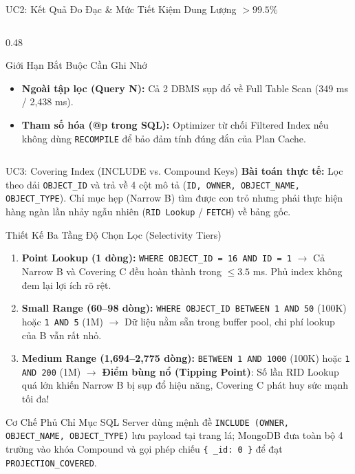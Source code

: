 \documentclass[aspectratio=169,9pt]{beamer}
\begin{document}
\begin{frame}{UC2: Kết Quả Đo Đạc \& Mức Tiết Kiệm Dung Lượng $>99.5\%$}
\begin{columns}[T]
\begin{column}{0.48\textwidth}
\begin{alertblock}{Giới Hạn Bắt Buộc Cần Ghi Nhớ}
\scriptsize
\begin{itemize}
  \item \textbf{Ngoài tập lọc (Query N):} Cả 2 DBMS sụp đổ về Full Table Scan (349 ms / 2,438 ms).
  \item \textbf{Tham số hóa (@p trong SQL):} Optimizer từ chối Filtered Index nếu không dùng \texttt{RECOMPILE} để bảo đảm tính đúng đắn của Plan Cache.
\end{itemize}
\end{alertblock}
\end{column}
\end{columns}
\end{frame}

\begin{frame}{UC3: Covering Index (INCLUDE vs. Compound Keys)}
\textbf{Bài toán thực tế:} Lọc theo dải \texttt{OBJECT\_ID} và trả về 4 cột mô tả (\texttt{ID, OWNER, OBJECT\_NAME, OBJECT\_TYPE}). Chỉ mục hẹp (Narrow B) tìm được con trỏ nhưng phải thực hiện hàng ngàn lần nhảy ngẫu nhiên (\texttt{RID Lookup} / \texttt{FETCH}) về bảng gốc.

\begin{block}{Thiết Kế Ba Tầng Độ Chọn Lọc (Selectivity Tiers)}
\footnotesize
\begin{enumerate}
  \item \textbf{Point Lookup (1 dòng):} \texttt{WHERE OBJECT\_ID = 16 AND ID = 1} $\to$ Cả Narrow B và Covering C đều hoàn thành trong $\le 3.5$ ms. Phủ index không đem lại lợi ích rõ rệt.
  \item \textbf{Small Range (60--98 dòng):} \texttt{WHERE OBJECT\_ID BETWEEN 1 AND 50} (100K) hoặc \texttt{1 AND 5} (1M) $\to$ Dữ liệu nằm sẵn trong buffer pool, chi phí lookup của B vẫn rất nhỏ.
  \item \textbf{Medium Range (1,694--2,775 dòng):} \texttt{BETWEEN 1 AND 1000} (100K) hoặc \texttt{1 AND 200} (1M) $\to$ \textbf{Điểm bùng nổ (Tipping Point)}: Số lần RID Lookup quá lớn khiến Narrow B bị sụp đổ hiệu năng, Covering C phát huy sức mạnh tối đa!
\end{enumerate}
\end{block}

\begin{exampleblock}{Cơ Chế Phủ Chỉ Mục}
\footnotesize
SQL Server dùng mệnh đề \texttt{INCLUDE (OWNER, OBJECT\_NAME, OBJECT\_TYPE)} lưu payload tại trang lá; MongoDB đưa toàn bộ 4 trường vào khóa Compound và gọi phép chiếu \texttt{\{ \_id: 0 \}} để đạt \texttt{PROJECTION\_COVERED}.
\end{exampleblock}
\end{frame}
\end{document}
